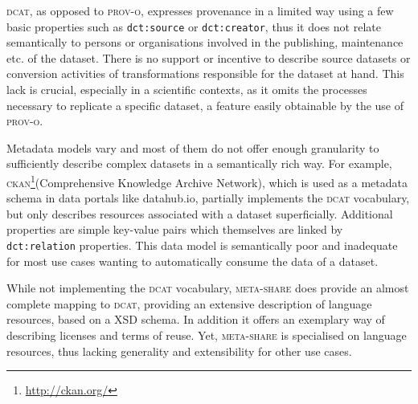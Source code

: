 \documentclass[runningheads,a4paper]{llncs}
\newcommand{\odrl}{{\scshape odrl}\xspace}
\newcommand{\prov}{{\scshape prov-o}\xspace}
\newcommand{\dct}{{\scshape dcterms}\xspace}
\newcommand{\ckan}{{\scshape ckan}\xspace}
\newcommand{\dcat}{{\scshape dcat}\xspace}
\newcommand{\metashare}{{\scshape meta-share}\xspace}
\newcommand{\prop}[1]{{{\texttt{#1}}}}
\newcommand\footnoteurl[1]{\footnote{\scriptsize\url{#1}}}
\begin{document}
\dcat, as opposed to \prov, expresses provenance in a limited way using a few basic properties such as
\prop{dct:source} or \prop{dct:creator}, thus it does not relate semantically to persons or organisations involved in the publishing, maintenance etc. of the dataset. %
There is no support or incentive to describe source datasets or conversion activities of transformations responsible for the dataset at hand. This lack is crucial, especially in a scientific contexts, as it omits the processes necessary to replicate a specific dataset, a feature easily obtainable by the use of \prov.
\iffalse
The Open Digital Rights Language (\odrl)\footnoteurl{https://www.w3.org/ns/odrl/2/ODRL21} is an initiative of the W3C community group\footnoteurl{https://www.w3.org/community/odrl/}, aiming to develop an open standard for policy expressions. The \odrl version 2.0 core model defines
licensing policies in regard to their permissions
granted, duties and constraints associated with these
permissions as well as involved legal parties. Thus, an \odrl
description allows to specify, in a machine-readable way, if
data can be edited, integrated or redistributed.
\fi%

Metadata models vary and most of them do not offer enough granularity to sufficiently describe complex datasets in a semantically rich way.
For example, \ckan{}\footnoteurl{http://ckan.org/}(Comprehensive Knowledge Archive Network), which is used as a metadata schema in data portals like datahub.io, partially implements the \dcat vocabulary, but only describes resources associated with a dataset superficially.
Additional properties are simple key-value pairs which themselves are linked by \prop{dct:relation} properties. This data model is semantically poor and inadequate for most use cases wanting to automatically consume the data of a dataset.

While not implementing the \dcat vocabulary, \metashare \cite{mccrae_2015_OWLmetashare} does provide an almost complete mapping to \dcat, providing an extensive description of language resources, based on a XSD schema.
In addition it offers an exemplary way of describing licenses and terms of reuse. Yet, \metashare is specialised on language resources, thus lacking generality and extensibility for other use cases.
\end{document}
